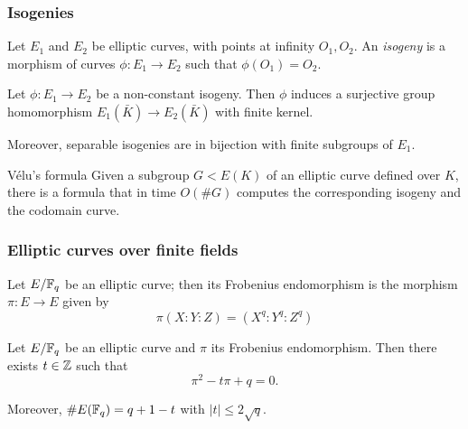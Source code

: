 \documentclass{beamer}
\begin{document}
    \begin{frame}
        \frametitle{Isogenies}
        
        \begin{definition}
            Let $E_1$ and $E_2$ be elliptic curves, with points at infinity $O_1,O_2$. An \emph{isogeny} is a morphism of curves $\phi:E_1\to E_2$ such that $\phi(O_1)=O_2$.
        \end{definition}
    
        \begin{theorem}
            Let $\phi:E_1 \to E_2$ be a non-constant isogeny. Then $\phi$ induces a surjective group homomorphism $E_1(\bar K)\to E_2(\bar K)$ with finite kernel.
            
            Moreover, separable isogenies are in bijection with finite subgroups of $E_1$.
        \end{theorem}
    
        \begin{block}{Vélu's formula}
            Given a subgroup $G<E(K)$ of an elliptic curve defined over $K$, there is a formula that in time $O(\# G)$ computes the corresponding isogeny and the codomain curve.
        \end{block}
    \end{frame}

    \begin{frame}
        \frametitle{Elliptic curves over finite fields}
        
        \begin{definition}
            Let $E/\mathbb{F}_q$ be an elliptic curve; then its Frobenius endomorphism is the morphism $\pi: E\to E$ given by $$\pi(X:Y:Z)=(X^q:Y^q:Z^q)$$
        \end{definition}
    
        \begin{theorem}
            Let $E/\mathbb{F}_q$ be an elliptic curve and $\pi$ its Frobenius endomorphism. Then there exists $t\in\mathbb{Z}$ such that $$\pi^2-t\pi+q=0.$$
            
            Moreover, $\# E(\mathbb{F}_q) = q+1-t$ with $|t|\le2\sqrt q$.
        \end{theorem}
    \end{frame}
\end{document}
